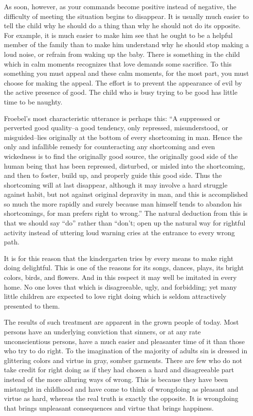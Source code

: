 \begin{linenumbers*}
\indent As soon, however, as your commands become positive instead of negative, the difficulty of meeting the situation begins to disappear. It is usually much easier to tell the child why he should do a thing than why he should not do its opposite. For example, it is much easier to make him see that he ought to be a helpful member of the family than to make him understand why he should stop making a loud noise, or refrain from waking up the baby. There is something in the child which in calm moments recognizes that love demands some sacrifice. To this something you must appeal and these calm moments, for the most part, you must choose for making the appeal. The effort is to prevent the appearance of evil by the active presence of good. The child who is busy trying to be good has little time to be naughty.

\indent Froebel's most characteristic utterance is perhaps this: ``A suppressed or perverted good quality--a good tendency, only repressed, misunderstood, or misguided--lies originally at the bottom of every shortcoming in man. Hence the only and infallible remedy for counteracting any shortcoming and even wickedness is to find the originally good source, the originally good side of the human being that has been repressed, disturbed, or misled into the shortcoming, and then to foster, build up, and properly guide this good side. Thus the shortcoming will at last disappear, although it may involve a hard struggle against habit, but not against original depravity in man, and this is accomplished so much the more rapidly and surely because man himself tends to abandon his shortcomings, for man prefers right to wrong.'' The natural deduction from this is that we should say ``do'' rather than ``don't; open up the natural way for rightful activity instead of uttering loud warning cries at the entrance to every wrong path.

\indent It is for this reason that the kindergarten tries by every means to make right doing delightful. This is one of the reasons for its songs, dances, plays, its bright colors, birds, and flowers. And in this respect it may well be imitated in every home. No one loves that which is disagreeable, ugly, and forbidding; yet many little children are expected to love right doing which is seldom attractively presented to them.

\indent The results of such treatment are apparent in the grown people of today. Most persons have an underlying conviction that sinners, or at any rate unconscientious persons, have a much easier and pleasanter time of it than those who try to do right. To the imagination of the majority of adults sin is dressed in glittering colors and virtue in gray, somber garments. There are few who do not take credit for right doing as if they had chosen a hard and disagreeable part instead of the more alluring ways of wrong. This is because they have been mistaught in childhood and have come to think of wrongdoing as pleasant and virtue as hard, whereas the real truth is exactly the opposite. It is wrongdoing that brings unpleasant consequences and virtue that brings happiness.


\end{linenumbers*}
